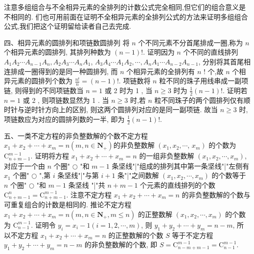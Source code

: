 注意多组组合与不全相异元素的全排列的计数公式完全相同,但它们的组合意义是不相同的.
们也可用前面在证明不全相异元素的全排列公式的方法来证明多组组合公式,我们把这个证明留给读者自己去完成.



四、相异元素的圆排列和项链数圆排列 将 $n$ 个不同元素不分首尾排成一圈,称为 $n$ 个相异元素的圆排列, 其排列种数为 $(n-1) !$.
证明因为 $n$ 个不同的直线排列 $A_1 A_2 \cdots A_{n-1} A_n, A_2 A_3 \cdots A_n A_1$, $A_3 A_4 \cdots A_1 A_2, \cdots, A_n A_1 \cdots A_{n-2} A_{n-1}$, 分别将其首尾相连排成一圈得到的是同一种圆排列, 而 $n$ 个相异元素的全排列有 $n$ ! 个,故 $n$ 个相异元素的圆排列个数为 $\frac{n !}{n}=(n-1) !$.
项链数将 $n$ 粒不同的珠子用线串成一副项链, 则得到的不同项链数当 $n=1$ 或 2 时为 1 , 当 $n \geqslant 3$ 时为 $\frac{1}{2}(n-1) !$.
证明若 $n=1$ 或 2 , 则项链数显然为 1 . 当 $n \geqslant 3$ 时,若 $n$ 粒不同珠子的两个圆排列仅有顺时针与逆时针方向上的区别, 则这两个圆排列对应的是同一副项链.
故当 $n \geqslant 3$ 时, 项链数应为对应的圆排列数的一半, 即为 $\frac{1}{2}(n -1) !$.



五、一类不定方程的非负整数解的个数不定方程 $x_1+x_2+\cdots+x_m=n\left(m, n \in \mathbf{N}_{+}\right)$的非负整数解 $\left(x_1, x_2, \cdots\right.$, $\left.x_m\right)$ 的个数为 $\mathrm{C}_{n+m-1}^{m-1}$.
证明将方程 $x_1+x_2+\cdots+x_m=n$ 的一组非负整数解 $\left(x_1, x_2, \cdots, x_m\right)$, 对应于一个由 $n$ 个圈" $\bigcirc$ "和 $m-1$ 条坚线"|"组成的排列其中第一条坚线"|"左侧有 $x_1$ 个圈" $\bigcirc$ ",第 $i$ 条坚线"|"与第 $i+1$ 条"|"之间数解 $\left(x_1, x_2, \cdots, x_m\right)$ 的个数等于 $n$ 个圈" $\bigcirc$ "和 $m-1$ 条坚线 "|"共 $n+m-1$ 个元素的直线排列的个数 $\mathrm{C}_{n+m-1}^n=\mathrm{C}_{n+m-1}^{m-1}$.
注意不定方程 $x_1+x_2+\cdots+x_m=n$ 的非负整数解的个数与可重复组合的计数是相同的.
推论不定方程 $x_1+x_2+\cdots+x_m=n\left(m, n \in \mathbf{N}_{+}, m \leqslant n\right)$ 的正整数解 $\left(x_1, x_2, \cdots, x_m\right)$ 的个数为 $\mathrm{C}_{n-1}^{m-1}$.
证明令 $y_i=x_i-1(i=1,2, \cdots, m)$, 则 $y_1+y_2+\cdots+y_m=n-m$, 所以不定方程 $x_1+x_2+\cdots+x_m=n$ 的正整数解的个数 $S$ 等于不定方程 $y_1+ y_2+\cdots+y_m=n-m$ 的非负整数解的个数, 即 $S=\mathrm{C}_{n-m+m-1}^{m-1}=\mathrm{C}_{n-1}^{m-1}$.



